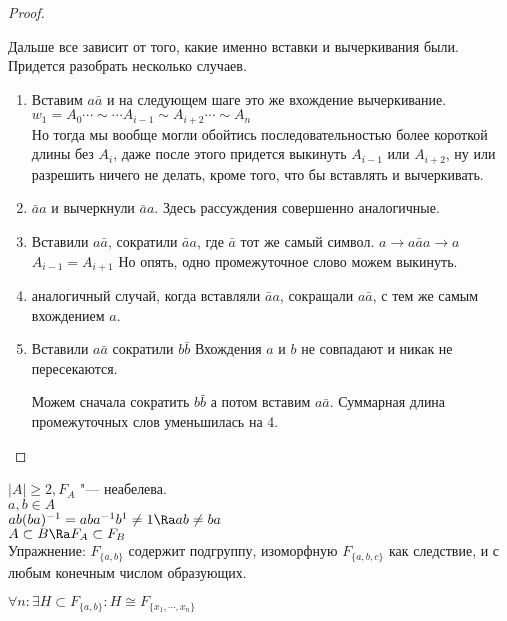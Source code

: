 \begin{proof}
\begin{description}
 Дальше все зависит от того, какие именно вставки и вычеркивания были. Придется разобрать несколько случаев.
 \begin{enumerate}
 \item Вставим $a\bar{a}$ и на следующем шаге это же вхождение вычеркивание. \\
 $w_1 = A_0 \cdots \sim \cdots A_{i - 1} \sim A_{i + 2} \cdots \sim A_n$ \\
 Но тогда мы вообще могли обойтись последовательностью более короткой длины без $A_i$, даже 
 после этого придется выкинуть $A_{i - 1}$ или $A_{i + 2}$, ну или разрешить ничего не делать, кроме того, 
 что бы вставлять и вычеркивать. 
 \item
 $\bar{a}a$ и вычеркнули $\bar{a}{a}$. Здесь рассуждения совершенно 
 аналогичные.
 \item
 Вставили $a\bar{a}$, сократили $\bar{a} a$, где $\bar{a}$ тот же самый символ. 
 $a \to a\bar{a}{a} \to a$\\
 $A_{i - 1} = A_{i + 1}$
 Но опять, одно промежуточное слово можем выкинуть.
 \item аналогичный случай, когда вставляли $\bar{a}a$, сокращали $a\bar{a}$, с тем же самым 
 вхождением $a$.
 \item
 Вставили $a\bar{a}$ сократили $b \bar{b}$
 Вхождения $a$ и $b$ не совпадают и никак не пересекаются. 

 Можем сначала сократить $b\bar{b}$ а потом вставим $a\bar{a}$. Суммарная длина
 промежуточных слов уменьшилась на 4.
 \end{enumerate}
 \end{description}
\end{proof}
\begin{Rem}
$|A| \ge 2, F_A$ "--- неабелева.\\
$a, b\in A$\\
$ab(ba)^{-1} = aba^{-1}b^{1} \ne 1\Ra ab \ne ba$ \\

$A \subset B \Ra F_A \subset F_B$\\
Упражнение: $F_{\{a, b\}}$ содержит подгруппу, изоморфную $F_{\{a, b, c\}}$ как
следствие, и с любым конечным числом образующих.

$\forall n \colon \exists H \subset F_{\{a, b\}} \colon H \cong F_{\{x_1, \cdots, x_n\}}$\\
\end{Rem}

